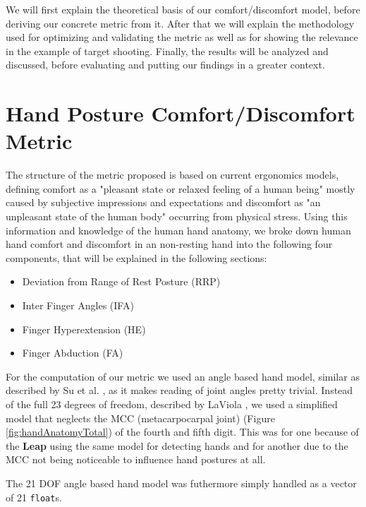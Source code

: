 \documentclass{sig-alternate-05-2015}
\begin{document}
We will first explain the theoretical basis of our comfort/discomfort model, before deriving our concrete metric from it. After that we will explain the methodology used for optimizing and validating the metric as well as for showing the relevance in the example of target shooting. Finally, the results will be analyzed and discussed, before evaluating and putting our findings in a greater context.


\section{Hand Posture Comfort/Discomfort Metric}
The structure of the metric proposed is based on current ergonomics models, defining comfort as a "pleasant state or relaxed feeling of a human being" mostly caused by subjective impressions and expectations and discomfort as "an unpleasant state of the human body" occurring from physical stress.\cite{vink2012editorial} Using this information and knowledge of the human hand anatomy, we broke down human hand comfort and discomfort in an non-resting hand into the following four components, that will be explained in the following sections: 

\begin{itemize}
	\item Deviation from Range of Rest Posture (RRP)
	\item Inter Finger Angles (IFA)
	\item Finger Hyperextension (HE)
	\item Finger Abduction (FA)
\end{itemize}

For the computation of our metric we used an angle based hand model, similar as described by Su et al. \cite{su1994logical}, as it makes reading of joint angles pretty trivial. Instead of the full 23 degrees of freedom, described by LaViola \cite{laviola1999survey}, we used a simplified model that neglects the MCC (metacarpocarpal joint) (Figure \ref{fig:handAnatomyTotal}) of the fourth and fifth digit. This was for one because of the \textbf{Leap} using the same model for detecting hands and for another due to the MCC not being noticeable to influence hand postures at all.

The 21 DOF angle based hand model was futhermore simply handled as a vector of 21 \texttt{float}s. 
\end{document}
